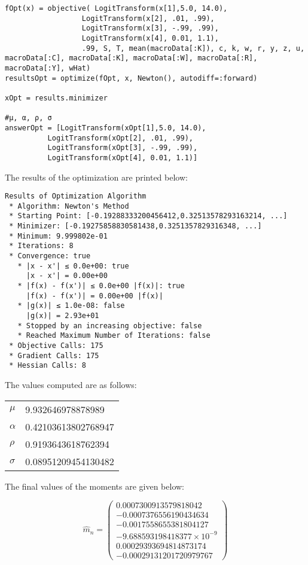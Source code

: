 \documentclass[12pt]{paper}
\newcommand{\est}[2][n]{ \widehat{ #2 }_{#1}}
\begin{document}
\begin{verbatim}
fOpt(x) = objective( LogitTransform(x[1],5.0, 14.0),
                  LogitTransform(x[2], .01, .99),
                  LogitTransform(x[3], -.99, .99),
                  LogitTransform(x[4], 0.01, 1.1),
                  .99, S, T, mean(macroData[:K]), c, k, w, r, y, z, u, macroData[:C], macroData[:K], macroData[:W], macroData[:R], macroData[:Y], wHat)
resultsOpt = optimize(fOpt, x, Newton(), autodiff=:forward)

xOpt = results.minimizer

#μ, α, ρ, σ
answerOpt = [LogitTransform(xOpt[1],5.0, 14.0),
          LogitTransform(xOpt[2], .01, .99),
          LogitTransform(xOpt[3], -.99, .99),
          LogitTransform(xOpt[4], 0.01, 1.1)]
\end{verbatim}
The results of the optimization are printed below:
\begin{verbatim}
Results of Optimization Algorithm
 * Algorithm: Newton's Method
 * Starting Point: [-0.19288333200456412,0.32513578293163214, ...]
 * Minimizer: [-0.19275858830581438,0.3251357829316348, ...]
 * Minimum: 9.999802e-01
 * Iterations: 8
 * Convergence: true
   * |x - x'| ≤ 0.0e+00: true 
     |x - x'| = 0.00e+00 
   * |f(x) - f(x')| ≤ 0.0e+00 |f(x)|: true
     |f(x) - f(x')| = 0.00e+00 |f(x)|
   * |g(x)| ≤ 1.0e-08: false 
     |g(x)| = 2.93e+01 
   * Stopped by an increasing objective: false
   * Reached Maximum Number of Iterations: false
 * Objective Calls: 175
 * Gradient Calls: 175
 * Hessian Calls: 8
\end{verbatim}

The values computed are as follows:

\begin{centering}
\begin{tabular}{ll}
  $\mu$ & 9.932646978878989\\
  $\alpha$ &  0.42103613802768947\\
  $\rho$ & 0.9193643618762394\\
  $\sigma$ & 0.08951209454130482
\end{tabular}
  
\end{centering}


The final values of the moments are given below:

\begin{equation*}
 \est{m} = \begin{pmatrix}
  0.0007300913579818042\\
 -0.0007376556190434634\\
 -0.0017558655381804127\\
 -9.688593198418377 \times 10^{-9}\\
  0.00029393694814873174\\
 -0.00029131201720979767
\end{pmatrix}  
\end{equation*}
\end{document}
